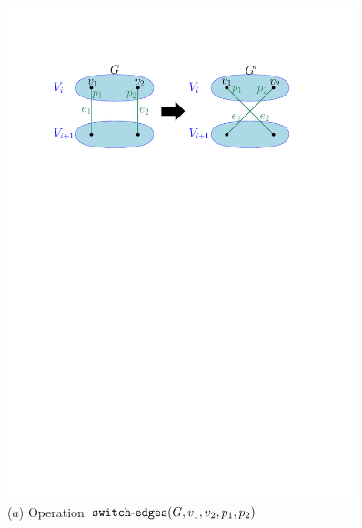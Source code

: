 \documentclass[11pt]{article}
\begin{document}
\begin{figure}[!t]
\begin{center}
  \begin{minipage}[t]{0.49\linewidth}
    \centering
	\includegraphics[width=0.9\textwidth]{images/switch-edges.pdf}\\
{\footnotesize ($a$) Operation ${\tt switch\mbox{-}edges}(G,v_1,v_2,p_1,p_2)$}
  \end{minipage}
  \begin{minipage}[t]{0.49\linewidth}
    \centering

\end{minipage}
\end{center}
\end{figure}
\end{document}
